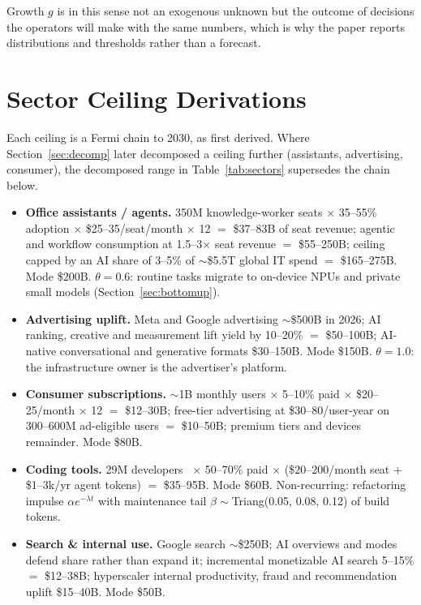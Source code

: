 \documentclass[11pt,letterpaper]{article}
\begin{document}
Growth $g$ is in this sense not an exogenous unknown but the outcome of decisions the operators will make with the same numbers, which is why the paper reports distributions and thresholds rather than a forecast.

\section{Sector Ceiling Derivations}\label{app:sectors}
Each ceiling is a Fermi chain to 2030, as first derived. Where Section~\ref{sec:decomp} later decomposed a ceiling further (assistants, advertising, consumer), the decomposed range in Table~\ref{tab:sectors} supersedes the chain below.
\begin{itemize}
    \item \textbf{Office assistants / agents.} 350M knowledge-worker seats $\times$ 35--55\% adoption $\times$ \$25--35/seat/month $\times$ 12 $=$ \$37--83B of seat revenue; agentic and workflow consumption at 1.5--3$\times$ seat revenue $=$ \$55--250B; ceiling capped by an AI share of 3--5\% of $\sim$\$5.5T global IT spend $=$ \$165--275B. Mode \$200B. $\theta=0.6$: routine tasks migrate to on-device NPUs and private small models (Section~\ref{sec:bottomup}).
    \item \textbf{Advertising uplift.} Meta and Google advertising $\sim$\$500B in 2026; AI ranking, creative and measurement lift yield by 10--20\% $=$ \$50--100B; AI-native conversational and generative formats \$30--150B. Mode \$150B. $\theta=1.0$: the infrastructure owner is the advertiser's platform.
    \item \textbf{Consumer subscriptions.} $\sim$1B monthly users $\times$ 5--10\% paid $\times$ \$20--25/month $\times$ 12 $=$ \$12--30B; free-tier advertising at \$30--80/user-year on 300--600M ad-eligible users $=$ \$10--50B; premium tiers and devices remainder. Mode \$80B.
    \item \textbf{Coding tools.} 29M developers~\cite{ref:octoverse} $\times$ 50--70\% paid $\times$ (\$20--200/month seat + \$1--3k/yr agent tokens) $=$ \$35--95B. Mode \$60B. Non-recurring: refactoring impulse $\alpha e^{-\lambda t}$ with maintenance tail $\beta\sim$Triang(0.05, 0.08, 0.12) of build tokens.
    \item \textbf{Search \& internal use.} Google search $\sim$\$250B; AI overviews and modes defend share rather than expand it; incremental monetizable AI search 5--15\% $=$ \$12--38B; hyperscaler internal productivity, fraud and recommendation uplift \$15--40B. Mode \$50B.

\end{itemize}
\end{document}
